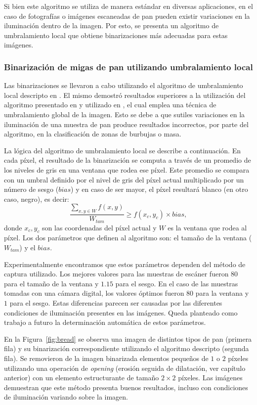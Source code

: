 Si bien este algoritmo se utiliza de manera estándar en diversas aplicaciones, en el caso de fotografías o imágenes escaneadas de pan pueden existir variaciones en la iluminación dentro de la imagen.
Por esto, se presenta un algoritmo de umbralamiento local que obtiene binarizaciones más adecuadas para estas imágenes. 


\subsubsection{Binarización de migas de pan utilizando umbralamiento local}
Las binarizaciones se llevaron a cabo utilizando el algoritmo de umbralamiento local descripto en \cite{White83}.
El mismo demostró resultados superiores a la utilización del algoritmo presentado en \cite{Huang95} y utilizado en \cite{Gonzales2008}, el cual emplea una técnica de umbralamiento global de la imagen.
Esto se debe a que sutiles variaciones en la iluminación de una muestra de pan produce resultados incorrectos, por parte del algoritmo, en la clasificación de zonas de burbujas o masa.


La lógica del algoritmo de umbralamiento local se describe a continuación.
En cada píxel, el resultado de la binarización se computa a través de un promedio de los niveles de gris en una ventana que rodea ese píxel. Este promedio se compara con un umbral definido por el nivel de gris del píxel actual multiplicado por un número de sesgo ($bias$) y en caso de ser mayor, el píxel resultará blanco (en otro caso, negro), es decir:
\begin{equation}
\frac{\sum_{x,y \in W} f(x,y) }{W_{tam}} \geq f(x_{c},y_{c}) \times bias,
\label{eqn:white}
\end{equation}
donde $x_{c},y_{c}$ son las coordenadas del píxel actual y  $W$ es la ventana que rodea al píxel. Los dos parámetros que definen al algoritmo son: el tamaño de la ventana ($W_{tam}$) y el $bias$. 

Experimentalmente encontramos que estos parámetros dependen del método de captura utilizado. Los mejores valores para las muestras de escáner fueron $80$ para el tamaño de la ventana y $1.15 $ para el sesgo. En el caso de las muestras tomadas con una cámara digital, los valores óptimos fueron $80$ para la ventana y $1$ para el sesgo.  Estas diferencias parecen ser causadas por las diferentes condiciones de iluminación presentes en las imágenes. Queda planteado como trabajo a futuro la determinación automática de estos parámetros.

En la Figura~\ref{fig:bread} se observa una imagen de distintos tipos de pan (primera fila) y su binarización correspondiente utilizando el algoritmo descripto (segunda fila).
Se removieron de la imagen binarizada elementos pequeños de $1$ o $2$ píxeles utilizando una operación de {\em opening} (erosión seguida de dilatación, ver capítulo anterior) con un elemento estructurante de tamaño $2\times 2$ píxeles.
Las imágenes demuestran que este método presenta buenos resultados, incluso con condiciones de iluminación variando sobre la imagen.

